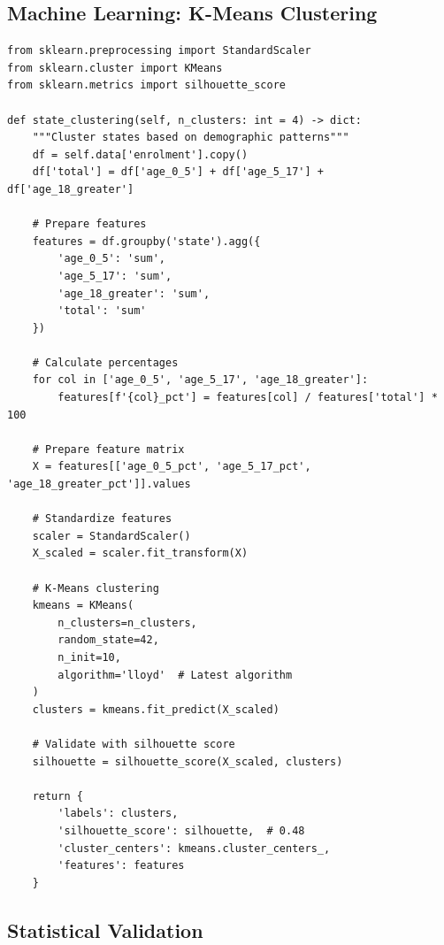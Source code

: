 \documentclass[12pt,a4paper]{article}
\begin{document}
\subsection{Machine Learning: K-Means Clustering}

\begin{lstlisting}[caption={State Clustering with scikit-learn 1.4}]
from sklearn.preprocessing import StandardScaler
from sklearn.cluster import KMeans
from sklearn.metrics import silhouette_score

def state_clustering(self, n_clusters: int = 4) -> dict:
    """Cluster states based on demographic patterns"""
    df = self.data['enrolment'].copy()
    df['total'] = df['age_0_5'] + df['age_5_17'] + df['age_18_greater']
    
    # Prepare features
    features = df.groupby('state').agg({
        'age_0_5': 'sum',
        'age_5_17': 'sum', 
        'age_18_greater': 'sum',
        'total': 'sum'
    })
    
    # Calculate percentages
    for col in ['age_0_5', 'age_5_17', 'age_18_greater']:
        features[f'{col}_pct'] = features[col] / features['total'] * 100
    
    # Prepare feature matrix
    X = features[['age_0_5_pct', 'age_5_17_pct', 'age_18_greater_pct']].values
    
    # Standardize features
    scaler = StandardScaler()
    X_scaled = scaler.fit_transform(X)
    
    # K-Means clustering
    kmeans = KMeans(
        n_clusters=n_clusters,
        random_state=42,
        n_init=10,
        algorithm='lloyd'  # Latest algorithm
    )
    clusters = kmeans.fit_predict(X_scaled)
    
    # Validate with silhouette score
    silhouette = silhouette_score(X_scaled, clusters)
    
    return {
        'labels': clusters,
        'silhouette_score': silhouette,  # 0.48
        'cluster_centers': kmeans.cluster_centers_,
        'features': features
    }
\end{lstlisting}

\subsection{Statistical Validation}
\end{document}
